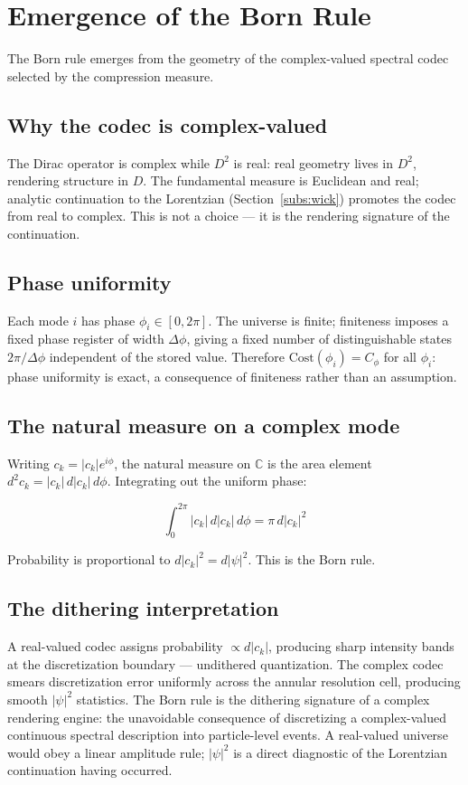 \documentclass[12pt,a4paper]{article}
\begin{document}
\section{Emergence of the Born Rule}
\label{sec:born}

The Born rule emerges from the geometry of the complex-valued spectral codec selected by the compression measure.

\subsection*{Why the codec is complex-valued}

The Dirac operator is complex while $D^2$ is real: real geometry lives in $D^2$, rendering structure in $D$. The fundamental measure is Euclidean and real; analytic continuation to the Lorentzian (Section~\ref{subs:wick}) promotes the codec from real to complex. This is not a choice --- it is the rendering signature of the continuation.

\subsection*{Phase uniformity}

Each mode $i$ has phase $\phi_i \in [0, 2\pi]$. The universe is finite; finiteness imposes a fixed phase register of width $\Delta\phi$, giving a fixed number of distinguishable states $2\pi/\Delta\phi$ independent of the stored value. Therefore $\text{Cost}(\phi_i) = C_\phi$ for all $\phi_i$: phase uniformity is exact, a consequence of finiteness rather than an assumption.

\subsection*{The natural measure on a complex mode}

Writing $c_k = |c_k|e^{i\phi}$, the natural measure on $\mathbb{C}$ is the area element $d^2c_k = |c_k|\,d|c_k|\,d\phi$. Integrating out the uniform phase:

\[
\int_0^{2\pi} |c_k|\,d|c_k|\,d\phi = \pi\,d|c_k|^2
\]

Probability is proportional to $d|c_k|^2 = d|\psi|^2$. This is the Born rule.

\subsection*{The dithering interpretation}

A real-valued codec assigns probability $\propto d|c_k|$, producing sharp intensity bands at the discretization boundary --- undithered quantization. The complex codec smears discretization error uniformly across the annular resolution cell, producing smooth $|\psi|^2$ statistics. The Born rule is the dithering signature of a complex rendering engine: the unavoidable consequence of discretizing a complex-valued continuous spectral description into particle-level events. A real-valued universe would obey a linear amplitude rule; $|\psi|^2$ is a direct diagnostic of the Lorentzian continuation having occurred.
\end{document}

